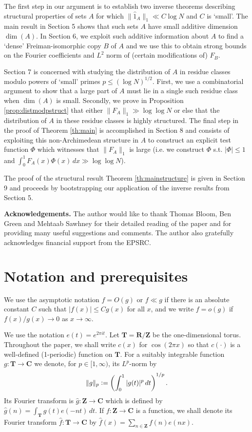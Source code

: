 \documentclass[11pt, reqno]{amsart}
\begin{document}
\smallskip

The first step in our argument is to establish two inverse theorems describing structural properties of sets $A$ for which $\lVert \hat{1}_A\rVert_1\ll C\log N$ and $C$ is `small'. The main result in Section 5 shows that such sets $A$ have small additive dimension $\dim(A)$. In Section 6, we exploit such additive information about $A$ to find a `dense' Freiman-isomorphic copy $B$ of $A$ and we use this to obtain strong bounds on the Fourier coefficients and $L^2$ norm of (certain modifications of) $F_{B}$.  

\smallskip

Section 7 is concerned with studying the distribution of $A$ in residue classes modulo powers of `small' primes $p\leqslant (\log N)^{1/2}$. First, we use a combinatorial argument to show that a large part of $A$ must lie in a single such residue class when $\dim(A)$ is small. Secondly, we prove in Proposition \ref{prop:distmodpstruct} that either $\lVert F_A\rVert_1\gg \log \log N$ or else that the distribution of $A$ in these residue classes is highly structured. The final step in the proof of Theorem \ref{th:main} is accomplished in Section 8 and consists of exploiting this non-Archimedean structure in $A$ to construct an explicit test function $\Phi$ which witnesses that $\lVert F_A\rVert_1$ is large (i.e. we construct $\Phi$ s.t. $|\Phi|\leqslant 1$ and $\int_0^1 F_A(x)\Phi(x)\,dx\gg \log \log N$).

\smallskip

The proof of the structural result Theorem \ref{th:mainstructure} is given in Section 9 and proceeds by bootstrapping our application of the inverse results from Section 5. 

\medskip

\textbf{Acknowledgements.}
The author would like to thank Thomas Bloom, Ben Green and Mehtaab Sawhney for their detailed reading of the paper and for providing many useful suggestions and comments. The author also gratefully acknowledges financial support from the EPSRC.
\section{Notation and prerequisites}
We use the asymptotic notation $f=O(g)$ or $f\ll g$ if there is an absolute constant $C$ such that $|f(x)|\leqslant C g(x)$ for all $x$, and we write $f=o(g)$ if $f(x)/g(x)\to 0$ as $x\to\infty$. 

\smallskip

We use the notation $e(t)=e^{2\pi i t}$. Let $\mathbf{T}=\mathbf{R}/\mathbf{Z}$ be the one-dimensional torus. Throughout the paper, we shall write $c(x)$ for $\cos(2\pi x)$ so that $c(\cdot)$ is a well-defined (1-periodic) function on $\mathbf{T}$. For a suitably  integrable function $g:\mathbf{T}\to\mathbf{C}$ we denote, for $p\in[1,\infty)$, its $L^p$-norm by $$\lVert g\rVert_p\vcentcolon= \left(\int_0^1|g(t)|^p\,dt\right)^{1/p}.$$ Its Fourier transform is $\hat{g}:\mathbf{Z}\to\mathbf{C}$ which is defined by $\hat{g}(n)=\int_\mathbf{T}g(t)e(-nt)\,dt$. If $f:\mathbf{Z}\to\mathbf{C}$ is a function, we shall denote its Fourier transform $\hat{f}:\mathbf{T}\to\mathbf{C}$ by $\hat{f}(x)=\sum_{n\in\mathbf{Z}}f(n)e(nx)$. 
\end{document}
